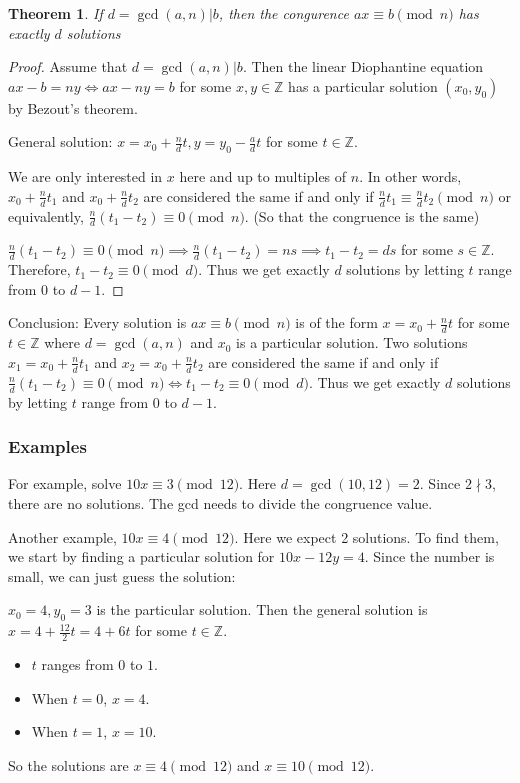 \documentclass[letterpaper,12pt,oneside]{article}
\newtheorem{theorem}{Theorem}
\begin{document}
\begin{theorem}
    If $d=\gcd(a,n)|b$, then the congurence $ax\equiv b \pmod n$ has exactly $d$ solutions
\end{theorem}
\begin{proof}
    Assume that $d=\gcd(a,n)|b$. Then the linear Diophantine equation $ax-b=ny \iff ax-ny=b$ for some $x,y\in \mathbb{Z}$ has a particular solution $(x_0,y_0)$ by Bezout's theorem.

    General solution: $x=x_0+\frac{n}{d}t, y=y_0-\frac{a}{d}t$ for some $t\in
        \mathbb{Z}$.

    We are only interested in $x$ here and up to multiples of $n$. In other words,
    $x_0+\frac{n}{d}t_1$ and $x_0+\frac{n}{d}t_2$ are considered the same if and
    only if $\frac{n}{d}t_1\equiv \frac{n}{d}t_2 \pmod {n}$ or equivalently,
    $\frac{n}{d}(t_1-t_2)\equiv 0 \pmod {n}$. (So that the congruence is the same)

    $\frac{n}{d}(t_1-t_2)\equiv 0 \pmod {n}\implies \frac{n}{d}(t_1-t_2)=ns \implies t_1-t_2=ds$ for some $s\in \mathbb{Z}$. Therefore, $t_1-t_2\equiv 0 \pmod d$. Thus we get exactly $d$ solutions by letting $t$ range from $0$ to $d-1$.
\end{proof}

Conclusion: Every solution is $ax\equiv b \pmod n$ is of the form
$x=x_0+\frac{n}{d}t$ for some $t\in \mathbb{Z}$ where $d=\gcd(a,n)$ and $x_0$
is a particular solution. Two solutions $x_1 = x_0+\frac{n}{d}t_1$ and $x_2 =
    x_0+\frac{n}{d}t_2$ are considered the same if and only if
$\frac{n}{d}(t_1-t_2)\equiv 0 \pmod {n} \iff t_1-t_2 \equiv 0 \pmod d$. Thus we
get exactly $d$ solutions by letting $t$ range from $0$ to $d-1$.
\subsubsection{Examples}
For example, solve $10x\equiv 3 \pmod {12}$. Here $d = \gcd(10,12) = 2$. Since
$2\nmid 3$, there are no solutions. The gcd needs to divide the congruence
value.

Another example, $10x\equiv 4 \pmod {12}$. Here we expect 2 solutions. To find
them, we start by finding a particular solution for $10x -12y = 4$. Since the
number is small, we can just guess the solution:

$x_0=4, y_0=3$ is the particular solution. Then the general solution is $x=4+\frac{12}{2}t=4+6t$ for some $t\in \mathbb{Z}$.
\begin{itemize}
    \item $t$ ranges from $0$ to $1$.
    \item When $t=0$, $x=4$.
    \item When $t=1$, $x=10$.
\end{itemize}
So the solutions are $x\equiv 4 \pmod {12}$ and $x\equiv 10 \pmod {12}$.
\end{document}
